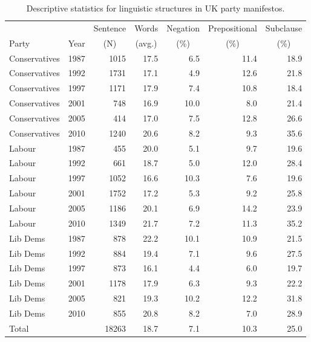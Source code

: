 \documentclass[a4paper, 12pt]{article}
\begin{document}
\begin{table}[htpb]
  \centering
  \begin{tabular}{lrrrrrr}
    \toprule
    & & Sentence & Words & Negation & Prepositional & Subclause \\
    Party & Year & \multicolumn{1}{c}{(N)} & \multicolumn{1}{c}{(avg.)} & \multicolumn{1}{c}{(\%)} & \multicolumn{1}{c}{(\%)} & \multicolumn{1}{c}{(\%)} \\
    \midrule
    Conservatives & 1987 & 1015 & 17.5 & 6.5 & 11.4 & 18.9 \\
    Conservatives & 1992 & 1731 & 17.1 & 4.9 & 12.6 & 21.8 \\
    Conservatives & 1997 & 1171 & 17.9 & 7.4 & 10.8 & 18.4 \\
    Conservatives & 2001 & 748 & 16.9 & 10.0 & 8.0 & 21.4 \\
    Conservatives & 2005 & 414 & 17.0 & 7.5 & 12.8 & 26.6 \\
    Conservatives & 2010 & 1240 & 20.6 & 8.2 & 9.3 & 35.6 \\
    \addlinespace
    Labour & 1987 & 455 & 20.0 & 5.1 & 9.7 & 19.6 \\
    Labour & 1992 & 661 & 18.7 & 5.0 & 12.0 & 28.4 \\
    Labour & 1997 & 1052 & 16.6 & 10.3 & 7.6 & 19.6 \\
    Labour & 2001 & 1752 & 17.2 & 5.3 & 9.2 & 25.8 \\
    Labour & 2005 & 1186 & 20.1 & 6.9 & 14.2 & 23.9 \\
    Labour & 2010 & 1349 & 21.7 & 7.2 & 11.3 & 35.2 \\
    \addlinespace
    Lib Dems & 1987 & 878 & 22.2 & 10.1 & 10.9 & 21.5 \\
    Lib Dems & 1992 & 884 & 19.4 & 7.1 & 9.6 & 27.5 \\
    Lib Dems & 1997 & 873 & 16.1 & 4.4 & 6.0 & 19.7 \\
    Lib Dems & 2001 & 1178 & 17.9 & 6.3 & 9.3 & 22.2 \\
    Lib Dems & 2005 & 821 & 19.3 & 10.2 & 12.2 & 31.8 \\
    Lib Dems & 2010 & 855 & 20.8 & 8.2 & 7.0 & 28.9 \\
    \midrule
    Total &  & 18263 & 18.7 & 7.1 & 10.3 & 25.0 \\
    \bottomrule
  \end{tabular}
  \caption{Descriptive statistics for linguistic structures in UK party manifestos.}
  \label{tab:summary-linguistic}
\end{table}
\end{document}
